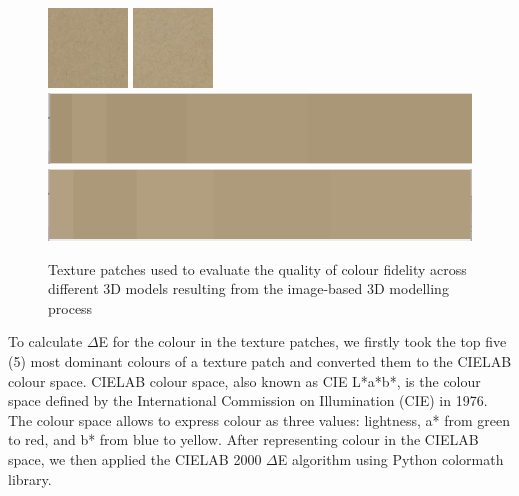 \documentclass[acmlarge,screen,dvipsnames]{acmart}
\begin{document}
\begin{figure}[ht] \centering
{}
  {\includegraphics[width=0.45\linewidth]{images/m1tex_80x80.png}
   \includegraphics[width=0.45\linewidth]{images/m2tex_80x80.png}
  }\\[-0.5\baselineskip]
  {\includegraphics[width=0.45\linewidth]{images/domtex1.png}
   \includegraphics[width=0.45\linewidth]{images/domtex2.png}
  }\\[-0.5\baselineskip]

 \caption{Texture patches used to evaluate the quality of colour fidelity across different 3D models resulting from the image-based 3D modelling process} 
 \label{fig:texturepatches} 
\end{figure} 


To calculate $\Delta$E for the colour in the texture patches, we firstly took 
the top five (5) most dominant colours of a texture
patch and converted them to the CIELAB colour space. CIELAB colour space,
also known as CIE L*a*b*, is the colour space defined by the International Commission on Illumination (CIE) in 1976. The colour space allows to express colour as
three values: lightness, a* from green to red, and b* from blue to yellow. After 
representing colour in the CIELAB space, we then applied the 
CIELAB 2000 $\Delta$E algorithm using Python colormath library. 
\end{document}
